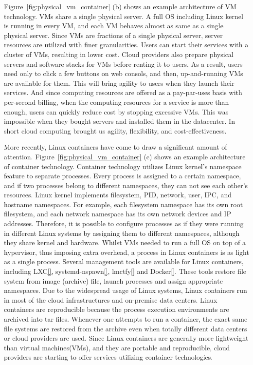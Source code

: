 Figure~\ref{fig:physical_vm_container} (b) shows an example architecture of VM technology. 
VMs share a single physical server.
A full OS including Linux kernel is running in every VM, and each VM behaves almost as same as a single physical server.
Since VMs are fractions of a single physical server, server resources are utilized with finer granularities.
Users can start their services with a cluster of VMs, resulting in lower cost.
Cloud providers also prepare physical servers and software stacks for VMs before renting it to users.
As a result, users need only to click a few buttons on web consols, and then, up-and-running VMs are available for them.
This will bring agility to users when they launch their services.
And since computing resources are offered as a pay-par-uses basis with per-second billing, when the computing resources for a service is more than enough, users can quickly reduce cost by stopping excessive VMs.
This was impossible when they bought servers and installed them in the datacenter.
In short cloud computing brought us agility, flexibility, and cost-effectiveness.


More recently, Linux containers\cite{menage2007adding} have come to draw a significant amount of attention.
Figure~\ref{fig:physical_vm_container} (c) shows an example architecture of container technology. 
Container technology utilizes Linux kernel's namespace feature to separate processes.  
Every process is assigned to a certain namespace, and if two processes belong to different namespaces, they can not see each other's resources. 
Linux kernel implements filesystem, PID, network, user, IPC, and hostname namespaces. 
For example, each filesystem namespace has its own root filesystem, and each network namespace has its own network devices and IP addresses.
Therefore, it is possible to configure processes as if they were running in different Linux systems by assigning them to different namespaces, although they share kernel and hardware.
Whilst VMs needed to run a full OS on top of a hypervisor, thus imposing extra overhead, a process in Linux containers is as light as a single process.
%
Several management tools are available for Linux containers, including LXC\ref{}, systemd-nspawn\ref{}, lmctfy\ref{} and Docker\ref{}.
These tools restore file system from image (archive) file, launch processes and assign appropriate namespaces.
Due to the widespread usage of Linux systems, Linux containers run in most of the cloud infrastructures and on-premise data centers.
Linux containers are reproducible because the process execution environments are archived into tar files.
Whenever one attempts to run a container, the exact same file systems are restored from the archive even when totally different data centers or cloud providers are used.
Since Linux containers are generally more lightweight than virtual machines(VMs), and they are portable and reproducible, 
cloud providers are starting to offer services utilizing container technologies.

